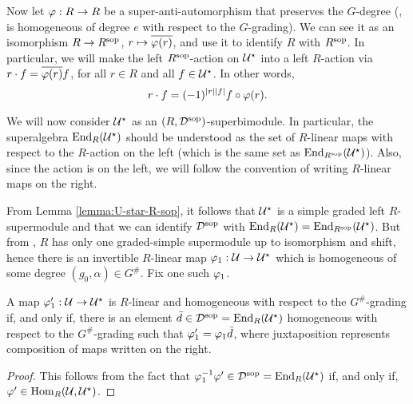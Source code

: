 Now let $\varphi: R\to R$ be a super-anti-automorphism that preserves the $G$-degree (\ie, is homogeneous of degree $e$ with respect to the $G$-grading).
We can see it as an isomorphism $R\to R^{\mathrm{sop}}$, $r \mapsto \overline{ \varphi(r)}$, and use it to identify $R$ with $R^{\mathrm{sop}}$.
In particular, we will make the left $R^{\mathrm{sop}}$-action on $\mathcal U^\star$ into a left $R$-action via $r\cdot f = \overline{\varphi(r)}f$, for all $r\in R$ and all $f\in \mathcal U^\star$.
In other words,
%
\begin{equation}\label{eq:R-action-back-on-the-right}
	r\cdot f = (-1)^{|r||f|} f \circ \varphi(r) .
\end{equation}

We will now consider $\mathcal U^\star$ as an $(R,\mathcal{D}^{\mathrm{sop}})$-superbimodule.
In particular, the superalgebra $\operatorname{End}_R(\mathcal U^\star)$ should be understood as the set of $R$-linear maps with respect to the $R$-action on the left (which is the same set as $\operatorname{End}_{R^{\mathrm{sop}}} (\mathcal U^\star)$).
Also, since the action is on the left, we will follow the convention of writing $R$-linear maps on the right.

From Lemma \ref{lemma:U-star-R-sop}, it follows that $\mathcal U^\star$ is a simple graded left $R$-supermodule and that we can identify $\mathcal{D}^{\mathrm{sop}}$ with $\operatorname{End}_R (\mathcal U^\star) = \operatorname{End}_{R^{\mathrm{sop}}} (\mathcal U^\star)$.
But from \cite[Lemma 2.7]{livromicha}, $R$ has only one graded-simple supermodule up to isomorphism and shift, hence there is an invertible $R$-linear map $\varphi_1: \mathcal U \to \mathcal U^\star$ which is homogeneous of some degree $(g_0, \alpha)\in G^\#$.
Fix one such $\varphi_1$.

\begin{lemma}\label{lemma:nonuniqueness-of-vphi1}
	A map $\varphi_1' : \mathcal U \to \mathcal U^\star$ is $R$-linear and homogeneous with respect to the $G^\#$-grading if, and only if, there is an element $\bar d\in \mathcal{D}^{\mathrm{sop}} = \operatorname{End}_R (\mathcal U^\star)$ homogeneous with respect to the $G^\#$-grading such that $ \varphi_1' = \varphi_1 \bar d$, where juxtaposition represents composition of maps written on the right.
\end{lemma}

\begin{proof}
	This follows from the fact that $ \varphi_1^{-1} \varphi' \in  \mathcal{D}^{\mathrm{sop}} = \operatorname{End}_R(\mathcal U^\star)$ if, and only if, $\varphi' \in \operatorname{Hom}_R(\mathcal U, \mathcal U^\star)$.
\end{proof}


